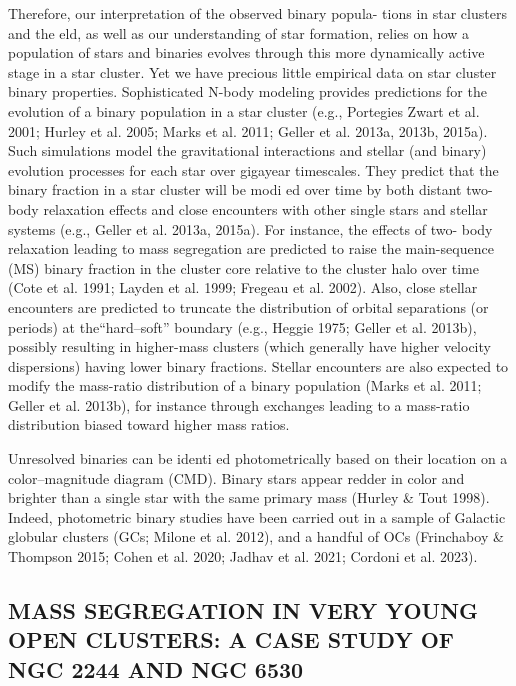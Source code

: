 \documentclass[../Main.tex]{subfiles}
\begin{document}
{Therefore, our interpretation of the observed binary popula-
tions in star clusters and the eld, as well as our understanding
of star formation, relies on how a population of stars and
binaries evolves through this more dynamically active stage in
a star cluster. Yet we have precious little empirical data on star
cluster binary properties.
Sophisticated N-body modeling provides predictions for the
evolution of a binary population in a star cluster (e.g., Portegies
Zwart et al. 2001; Hurley et al. 2005; Marks et al. 2011; Geller
et al. 2013a, 2013b, 2015a). Such simulations model the
gravitational interactions and stellar (and binary) evolution
processes for each star over gigayear timescales. They predict
that the binary fraction in a star cluster will be modi ed over
time by both distant two-body relaxation effects and close
encounters with other single stars and stellar systems (e.g.,
Geller et al. 2013a, 2015a). For instance, the effects of two-
body relaxation leading to mass segregation are predicted to
raise the main-sequence (MS) binary fraction in the cluster core relative to the cluster halo over time (Cote et al. 1991; Layden
et al. 1999; Fregeau et al. 2002). Also, close stellar encounters
are predicted to truncate the distribution of orbital separations
(or periods) at the“hard–soft” boundary (e.g., Heggie 1975;
Geller et al. 2013b), possibly resulting in higher-mass clusters
(which generally have higher velocity dispersions) having
lower binary fractions. Stellar encounters are also expected to
modify the mass-ratio distribution of a binary population
(Marks et al. 2011; Geller et al. 2013b), for instance through
exchanges leading to a mass-ratio distribution biased toward
higher mass ratios.

Unresolved binaries can be identi ed photometrically based
on their location on a color–magnitude diagram (CMD). Binary
stars appear redder in color and brighter than a single star with
the same primary mass (Hurley & Tout 1998). Indeed,
photometric binary studies have been carried out in a sample
of Galactic globular clusters (GCs; Milone et al. 2012), and a
handful of OCs (Frinchaboy & Thompson 2015; Cohen et al.
2020; Jadhav et al. 2021; Cordoni et al. 2023).

\subsection{MASS SEGREGATION IN VERY YOUNG OPEN CLUSTERS:
A CASE STUDY OF NGC 2244 AND NGC 6530}


}
\end{document}
